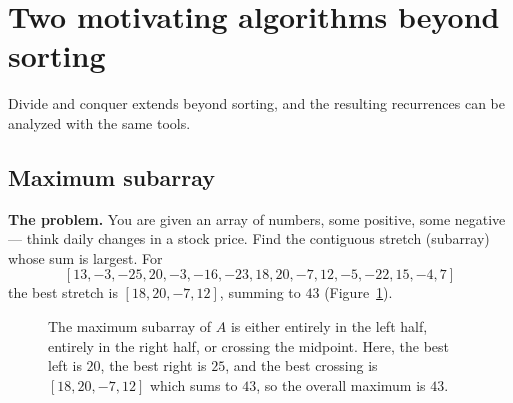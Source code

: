\section{Two motivating algorithms beyond sorting}

Divide and conquer extends beyond sorting, and the resulting recurrences can be analyzed with the same tools.

\subsection{Maximum subarray}

\textbf{The problem.} You are given an array of numbers, some positive, some
negative --- think daily changes in a stock price. Find the contiguous stretch
(subarray) whose sum is largest. For
\[[13,-3,-25,20,-3,-16,-23,18,20,-7,12,-5,-22,15,-4,7]\]
the best stretch is $[18,20,-7,12]$, summing to $43$ (Figure~\ref{ch04:maxsubarray_trace}).

\begin{figure}[H]
\centering
{}
\caption{The maximum subarray of $A$ is either entirely in the left half, entirely in the right half, or crossing the midpoint. Here, the best left is $20$, the best right is $25$, and the best crossing is $[18,20,-7,12]$ which sums to $43$, so the overall maximum is $43$.}
\label{ch04:maxsubarray_trace}
\end{figure}


